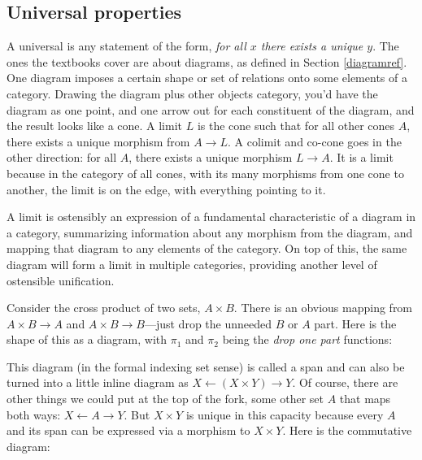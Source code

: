 \documentclass[11pt]{article}
\begin{document}
\subsection{Universal properties}\label{universalsec}
A universal is any statement of the form, {\em for all $x$ there exists a unique $y$}.
The ones the textbooks cover are about diagrams, as defined in Section \ref{diagramref}.
One diagram imposes a certain shape or set of relations onto some elements of a category.
Drawing the diagram plus other objects category, you'd have the diagram as one point, and
one arrow out for each constituent of the diagram, and the result looks like a cone.
A limit $L$ is the cone such that for all other cones $A$, there exists a unique
morphism from $A\to L$. A colimit and co-cone goes in the other direction: for all $A$,
there exists a unique morphism $L\to A$. It is a limit because in the category of all
cones, with its many morphisms from one cone to another, the limit is on the edge,
with everything pointing to it.

A limit is ostensibly an expression of a fundamental characteristic of a diagram in a
category, summarizing information about any morphism from the diagram, and mapping that
diagram to any elements of the category. On top of this, the same diagram will form a
limit in multiple categories, providing another level of ostensible unification.

Consider the cross product of two sets, $A\times B$. There is an obvious mapping from
$A\times B \to A$ and $A\times B \to B$---just drop the unneeded $B$ or $A$ part. Here
is the shape of this as a diagram, with $\pi_1$ and $\pi_2$ being the {\em drop one
part} functions:


This diagram (in the formal indexing set sense) is called a span and can also be turned into a little inline diagram as
$X \leftarrow (X\times Y) \rightarrow Y$.
Of course, there are other things we could put at the top of the fork, some other
set $A$ that maps both ways: $X \leftarrow A \rightarrow Y$.
But $X\times Y$ is unique in this capacity because every $A$ and its span can be expressed
via a morphism to $X\times Y$. Here is the commutative diagram:

\end{document}

